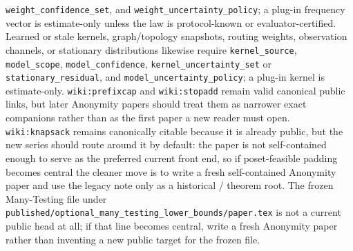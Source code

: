 \documentclass[11pt]{article}
\begin{document}
\nolinkurl{weight_confidence_set}, and \nolinkurl{weight_uncertainty_policy}; a plug-in frequency vector is estimate-only unless the law is protocol-known or evaluator-certified. Learned or stale kernels, graph/topology snapshots, routing weights, observation channels, or stationary distributions likewise require \nolinkurl{kernel_source}, \nolinkurl{model_scope}, \nolinkurl{model_confidence}, \nolinkurl{kernel_uncertainty_set} or \nolinkurl{stationary_residual}, and \nolinkurl{model_uncertainty_policy}; a plug-in kernel is estimate-only.
\texttt{wiki:prefixcap} and \texttt{wiki:stopadd} remain valid canonical public links, but later Anonymity papers should treat them as narrower exact companions rather than as the first paper a new reader must open.
\texttt{wiki:knapsack} remains canonically citable because it is already public, but the new series should route around it by default: the paper is not self-contained enough to serve as the preferred current front end, so if poset-feasible padding becomes central the cleaner move is to write a fresh self-contained Anonymity paper and use the legacy note only as a historical / theorem root.
The frozen Many-Testing file under \nolinkurl{published/optional_many_testing_lower_bounds/paper.tex} is not a current public head at all; if that line becomes central, write a fresh Anonymity paper rather than inventing a new public target for the frozen file.
\end{document}
